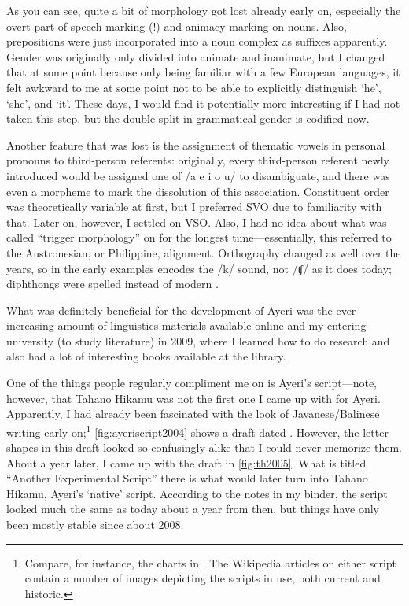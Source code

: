 As you can see, quite a bit of morphology got lost already early on, especially
the overt part-of-speech marking (!) and animacy marking on nouns. Also,
prepositions were just incorporated into a noun complex as suffixes apparently.
Gender was originally only divided into animate and inanimate, but I changed
that at some point because only being familiar with a few European languages,
it felt awkward to me at some point not to be able to explicitly distinguish
`he', `she', and `it'. These days, I would find it potentially more interesting
if I had not taken this step, but the double split in grammatical gender is
codified now.

Another feature that was lost is the assignment of thematic vowels in personal
pronouns to third-person referents: originally, every third-person referent
newly introduced would be assigned one of /a e i o u/ to disambiguate, and
there was even a morpheme to mark the dissolution of this association.
Constituent order was theoretically variable at first, but I preferred SVO due
to familiarity with that. Later on, however, I settled on VSO. Also, I had no
idea about what was called ``trigger morphology'' on  for
the longest time---essentially, this referred to the Austronesian, or
Philippine, alignment. Orthography changed as well over the years, so 
in the early examples encodes the /k/ sound, not /ʧ/ as it does today;
diphthongs were spelled  instead of modern .

What was definitely beneficial for the development of Ayeri was the ever 
increasing amount of linguistics materials available online and my entering 
university (to study literature) in 2009, where I learned how to do research 
and also had a lot of interesting books available at the library.

One of the things people regularly compliment me on is Ayeri's script---note,
however, that Tahano Hikamu was not the first one I came
up with for Ayeri. Apparently, I had already been fascinated with the look of
Javanese/Balinese writing early on;\footnote{Compare, for instance, the charts
in \citet{kuipersmcdermott1996}. The Wikipedia articles on either script
contain a number of images depicting the scripts in use, both current and
historic.} \autoref{fig:ayeriscript2004} shows a draft dated
. However, the letter shapes in this draft looked so
confusingly alike that I could never memorize them. About a year later, I came
up with the draft in \autoref{fig:th2005}. What is titled ``Another
Experimental Script'' there is what would later turn into Tahano Hikamu,
Ayeri's `native' script. According to the notes in my binder, the script
looked much the same as today about a year from then, but things have only been
mostly stable since about 2008.

